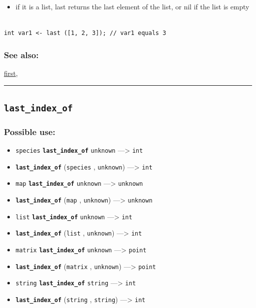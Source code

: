 \documentclass[]{book}
\providecommand{\tightlist}{%
  \setlength{\itemsep}{0pt}\setlength{\parskip}{0pt}}
\theoremstyle{definition}
\theoremstyle{definition}
\theoremstyle{definition}
\theoremstyle{remark}
\begin{document}
\begin{itemize}
\tightlist
\item
  if it is a list, last returns the last element of the list, or nil if
  the list is empty
\end{itemize}

\begin{verbatim}
 
int var1 <- last ([1, 2, 3]); // var1 equals 3
\end{verbatim}

\subsubsection{See also:}\label{see-also-122}

\href{operators-d-to-h.html\#first}{first},

\begin{center}\rule{0.5\linewidth}{\linethickness}\end{center}

\subsection{\texorpdfstring{\texttt{last\_index\_of}}{last\_index\_of}}\label{last_index_of}

\subsubsection{Possible use:}\label{possible-use-317}

\begin{itemize}
\tightlist
\item
  \texttt{species} \textbf{\texttt{last\_index\_of}} \texttt{unknown}
  ---\textgreater{} \texttt{int}
\item
  \textbf{\texttt{last\_index\_of}} (\texttt{species} ,
  \texttt{unknown}) ---\textgreater{} \texttt{int}
\item
  \texttt{map} \textbf{\texttt{last\_index\_of}} \texttt{unknown}
  ---\textgreater{} \texttt{unknown}
\item
  \textbf{\texttt{last\_index\_of}} (\texttt{map} , \texttt{unknown})
  ---\textgreater{} \texttt{unknown}
\item
  \texttt{list} \textbf{\texttt{last\_index\_of}} \texttt{unknown}
  ---\textgreater{} \texttt{int}
\item
  \textbf{\texttt{last\_index\_of}} (\texttt{list} , \texttt{unknown})
  ---\textgreater{} \texttt{int}
\item
  \texttt{matrix} \textbf{\texttt{last\_index\_of}} \texttt{unknown}
  ---\textgreater{} \texttt{point}
\item
  \textbf{\texttt{last\_index\_of}} (\texttt{matrix} , \texttt{unknown})
  ---\textgreater{} \texttt{point}
\item
  \texttt{string} \textbf{\texttt{last\_index\_of}} \texttt{string}
  ---\textgreater{} \texttt{int}
\item
  \textbf{\texttt{last\_index\_of}} (\texttt{string} , \texttt{string})
  ---\textgreater{} \texttt{int}
\end{itemize}
\end{document}
